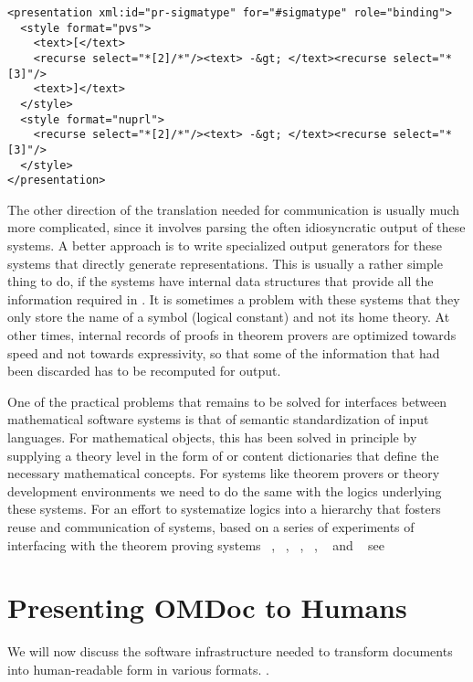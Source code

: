 \begin{omgroup}[id=transform-xsl,short=Transforming OMDoc]
\begin{lstlisting}[label=lst:system-language,
  caption={A {\element{symbol}} in a Language Definition Theory},
  index={symbol,presentation,style}]
<presentation xml:id="pr-sigmatype" for="#sigmatype" role="binding">
  <style format="pvs">
    <text>[</text>
    <recurse select="*[2]/*"/><text> -&gt; </text><recurse select="*[3]"/>
    <text>]</text>
  </style>
  <style format="nuprl">
    <recurse select="*[2]/*"/><text> -&gt; </text><recurse select="*[3]"/>
  </style>
</presentation>
\end{lstlisting}

The other direction of the translation needed for communication is usually much
more complicated, since it involves parsing the often idiosyncratic output of
these systems. A better approach is to write specialized output generators for
these systems that directly generate {\omdoc} representations. This is usually a
rather simple thing to do, if the systems have internal data structures that
provide all the information required in {\omdoc}. It is sometimes a problem with
these systems that they only store the name of a symbol (logical constant) and not
its home theory. At other times, internal records of proofs in theorem provers are
optimized towards speed and not towards expressivity, so that some of the
information that had been discarded has to be recomputed for {\omdoc} output.

One of the practical problems that remains to be solved for interfaces between
mathematical software systems is that of semantic standardization of input
languages. For mathematical objects, this has been solved in principle by supplying a
theory level in the form of {\openmath} or {\omdoc} content dictionaries that define the
necessary mathematical concepts. For systems like theorem provers or theory development
environments we need to do the same with the logics underlying these systems. For an
effort to systematize logics into a hierarchy that fosters reuse and communication of
systems, based on a series of experiments of interfacing with the theorem proving systems
{\OMEGA}~\cite{BenzmuellerEtAl:otama97}, {\inka}~\cite{HuSe:itng96}, {\pvs}~\cite{OwRu92},
{\lambdaclam}~\cite{RicSmaGre:ppihol98}, {\tps}~\cite{AnBi:tatps96} and
{\coq}~\cite{CoqManual} see {}


\section{Presenting OMDoc to Humans}\label{sec:omdoc2pres}

\begin{omtext}
We will now discuss the software infrastructure needed to transform {\omdoc} documents
into human-readable form in various formats. .
\end{omtext}


\end{omgroup}
